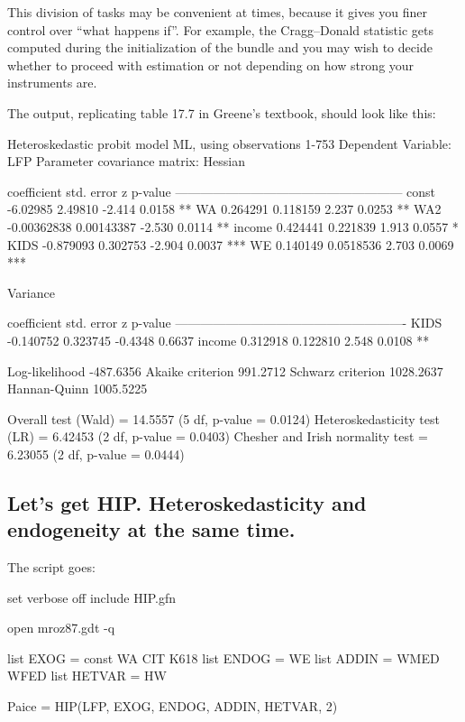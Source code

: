 \documentclass[a4paper,10pt]{article}
\newcounter{script}[section]
\begin{document}
This division of tasks may be convenient at times, because it gives
you finer control over ``what happens if''. For example, the
Cragg--Donald statistic gets computed during the initialization of the
bundle and you may wish to decide whether to proceed with estimation
or not depending on how strong your instruments are.

The output, replicating table 17.7 in Greene's textbook, should look
like this:

\begin{code}
Heteroskedastic probit model 
ML, using observations 1-753
Dependent Variable: LFP 
Parameter covariance matrix: Hessian

             coefficient   std. error     z      p-value
  ------------------------------------------------------
  const      -6.02985      2.49810      -2.414   0.0158  **
  WA          0.264291     0.118159      2.237   0.0253  **
  WA2        -0.00362838   0.00143387   -2.530   0.0114  **
  income      0.424441     0.221839      1.913   0.0557  *
  KIDS       -0.879093     0.302753     -2.904   0.0037  ***
  WE          0.140149     0.0518536     2.703   0.0069  ***

Variance 

             coefficient   std. error      z      p-value
  -------------------------------------------------------
  KIDS        -0.140752     0.323745    -0.4348   0.6637 
  income       0.312918     0.122810     2.548    0.0108  **

Log-likelihood        -487.6356  Akaike criterion     991.2712
Schwarz criterion     1028.2637  Hannan-Quinn        1005.5225

Overall test (Wald) = 14.5557 (5 df, p-value = 0.0124)
Heteroskedasticity test (LR) = 6.42453 (2 df, p-value = 0.0403)
Chesher and Irish normality test = 6.23055 (2 df, p-value = 0.0444)
\end{code}

\subsection{Let's get HIP. Heteroskedasticity and endogeneity at the
  same time.}

The script goes:
\begin{code}
set verbose off 
include HIP.gfn

open mroz87.gdt -q

list EXOG =  const WA CIT K618 
list ENDOG = WE
list ADDIN =  WMED WFED 
list HETVAR = HW 

Paice = HIP(LFP, EXOG, ENDOG, ADDIN, HETVAR, 2)
\end{code}
\end{document}
